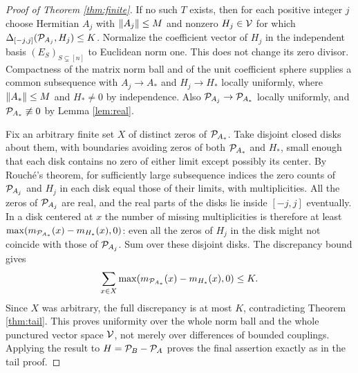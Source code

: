 \documentclass[11pt]{article}
\theoremstyle{definition}\newtheorem{definition}[theorem]{Definition}
\begin{document}
\begin{proof}[Proof of Theorem \ref{thm:finite}]
If no such $T$ exists, then for each positive integer $j$ choose Hermitian $A_j$ with $\left\|A_j\right\|\le M$ and nonzero $H_j\in\mathcal V$ for which $\Delta_{[-j,j]}(\mathcal P_{A_j},H_j)\le K$. Normalize the coefficient vector of $H_j$ in the independent basis $(E_S)_{S\subsetneq[n]}$ to Euclidean norm one. This does not change its zero divisor. Compactness of the matrix norm ball and of the unit coefficient sphere supplies a common subsequence with $A_j\to A_*$ and $H_j\to H_*$ locally uniformly, where $\left\|A_*\right\|\le M$ and $H_*\ne0$ by independence. Also $\mathcal P_{A_j}\to\mathcal P_{A_*}$ locally uniformly, and $\mathcal P_{A_*}\not\equiv0$ by Lemma \ref{lem:real}.

Fix an arbitrary finite set $X$ of distinct zeros of $\mathcal P_{A_*}$. Take disjoint closed disks about them, with boundaries avoiding zeros of both $\mathcal P_{A_*}$ and $H_*$, small enough that each disk contains no zero of either limit except possibly its center. By Rouch\'e's theorem, for sufficiently large subsequence indices the zero counts of $\mathcal P_{A_j}$ and $H_j$ in each disk equal those of their limits, with multiplicities. All the zeros of $\mathcal P_{A_j}$ are real, and the real parts of the disks lie inside $[-j,j]$ eventually. In a disk centered at $x$ the number of missing multiplicities is therefore at least $\max(m_{\mathcal P_{A_*}}(x)-m_{H_*}(x),0)$: even all the zeros of $H_j$ in the disk might not coincide with those of $\mathcal P_{A_j}$. Sum over these disjoint disks. The discrepancy bound gives
\[
 \sum_{x\in X}\max(m_{\mathcal P_{A_*}}(x)-m_{H_*}(x),0)\le K.
\]
Since $X$ was arbitrary, the full discrepancy is at most $K$, contradicting Theorem \ref{thm:tail}. This proves uniformity over the whole norm ball and the whole punctured vector space $\mathcal V$, not merely over differences of bounded couplings. Applying the result to $H=\mathcal P_B-\mathcal P_A$ proves the final assertion exactly as in the tail proof.
\end{proof}
\end{document}
